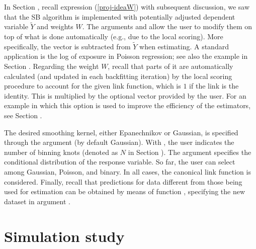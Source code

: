 In Section , recall expression (\ref{proj-ideaW}) with subsequent discussion, we saw that the SB algorithm is implemented with potentially adjusted dependent variable $\tilde Y$ and weights $W$. The arguments  and   allow the user to modify them on top of what is done automatically (e.g., due to the local scoring). More specifically, the vector   is subtracted from $\tilde Y$ when estimating. A standard application is the log of exposure in Poisson regression; see also the example in Section . Regarding the weight $W$, recall that parts of it are automatically calculated (and updated in each backfitting iteration) by the local scoring procedure to account for the given link function, which is $1$ if the link is the identity. This is multiplied by the optional vector   provided by the user. For an example in which this option is used to improve the efficiency of the estimators, see Section .

The desired smoothing kernel, either Epanechnikov or Gaussian, is specified through the argument  (by default Gaussian). With , the user indicates the number of binning knots (denoted as $N$ in Section ). The argument   specifies the conditional distribution of the response variable. So far, the user can select among Gaussian, Poisson, and binary. In all cases, the canonical link function is considered. Finally, recall that predictions for data different from those being used for estimation can be obtained by means of function , specifying the new dataset in argument . 


\section{Simulation study} \label{sec-simulation}


